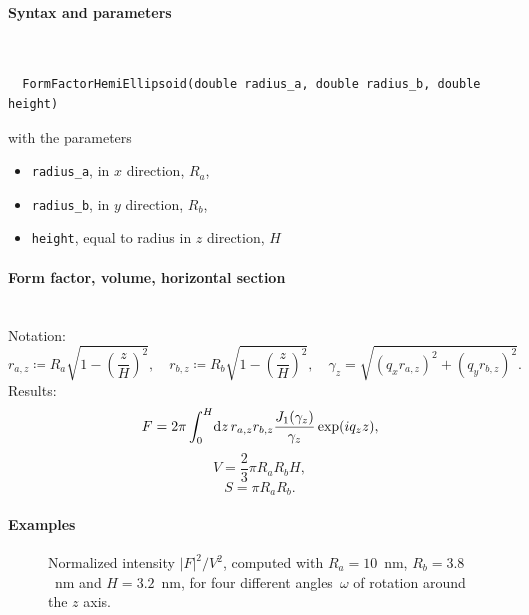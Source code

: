 \paragraph{Syntax and parameters}\strut\\[-2ex plus .2ex minus .2ex]
\begin{lstlisting}
  FormFactorHemiEllipsoid(double radius_a, double radius_b, double height)
\end{lstlisting}
with the parameters
\begin{itemize}
\item \texttt{radius\_a}, in $x$ direction, $R_a$,
\item \texttt{radius\_b}, in $y$ direction, $R_b$,
\item \texttt{height}, equal to radius in $z$ direction, $H$
\end{itemize}

\paragraph{Form factor, volume, horizontal section}\strut\\
Notation:
\begin{equation*}
 r_{a,z} \coloneqq R_a \sqrt{1-\left(\dfrac{z}{H} \right)^2},\quad
 r_{b,z} \coloneqq R_b \sqrt{1-\left(\dfrac{z}{H} \right)^2}, \quad
 \gamma_z =\sqrt{(q_x r_{a,z})^2+(q_y r_{b,z})^2}.
\end{equation*}
Results:
\begin{equation*}
  F = 2\pi \int_0^{H} \!\mathrm d z\, r_{a,z} r_{b,z}
                               \frac{J_1(\gamma_z)}{\gamma_z}\exp(iq_z z),
\end{equation*}
\begin{equation*}
  V = \dfrac{2}{3}\pi R_a R_bH,
\end{equation*}
\begin{equation*}
  S =\pi R_a R_b.
\end{equation*}

\paragraph{Examples}\strut

\begin{figure}[H]
\begin{center}
\end{center}
\caption{Normalized intensity $|F|^2/V^2$,
computed with $R_a=10$~nm, $R_b=3.8$~nm and $H=3.2$~nm,
for four different angles~$\omega$ of rotation around the $z$ axis.}
\end{figure}

